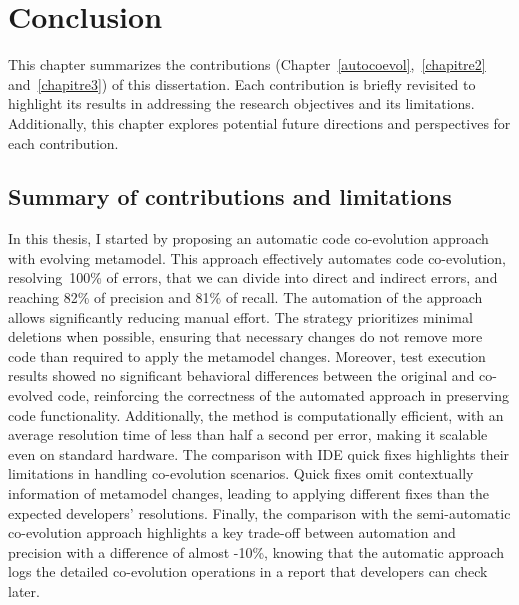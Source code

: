 \chapter{Conclusion}
This chapter summarizes the contributions (Chapter~\ref{autocoevol},~\ref{chapitre2} and~\ref{chapitre3}) of this dissertation.%
  Each contribution is briefly revisited to highlight its results in addressing the research objectives and its limitations. Additionally, this chapter explores potential future directions and perspectives for each contribution.%



\section{ Summary of contributions and limitations}
In this thesis, I started by proposing an automatic code co-evolution approach with evolving metamodel.
This approach effectively automates code co-evolution, resolving~100\% of errors, that we can divide into direct and indirect errors, and reaching 82\% of precision and 81\% of recall. The automation of the approach allows significantly reducing manual effort. The strategy prioritizes minimal deletions when possible, ensuring that necessary changes do not remove more code than required to apply the metamodel changes. Moreover, test execution results showed no significant behavioral differences between the original and co-evolved code, reinforcing the correctness of the automated approach in preserving code functionality. Additionally, the method is computationally efficient, with an average resolution time of less than half a second per error, making it scalable even on standard hardware. The comparison with IDE quick fixes highlights their limitations in handling co-evolution scenarios. Quick fixes omit contextually information of  metamodel changes, leading to applying different fixes than the expected developers' resolutions.
Finally, the comparison with the semi-automatic co-evolution approach \cite{Khelladi2020} highlights a key trade-off between automation and precision with a difference of almost -10\%, knowing that the automatic approach logs the detailed co-evolution operations in a report that developers can check later. 

